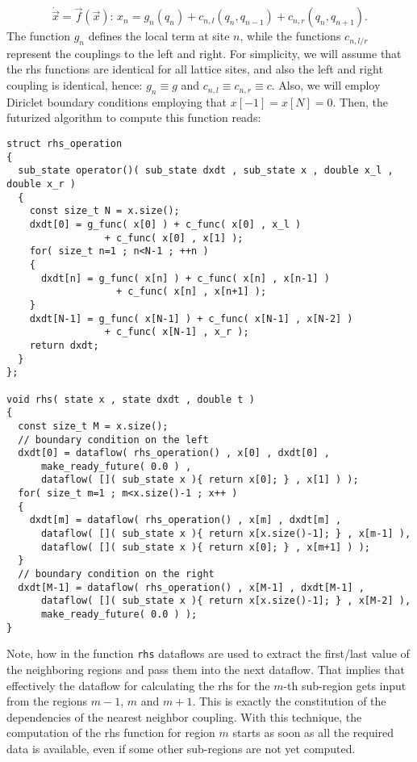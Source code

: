 \documentclass[10pt]{scrartcl}
\begin{document}
\begin{equation}
 \dot{\vec x} = \vec f(\vec x):\, x_n = g_n(q_n) + c_{n,l}(q_{n},q_{n-1}) + c_{n,r}(q_{n},q_{n+1}).
\end{equation} 
The function $g_n$ defines the local term at site $n$, while the functions $c_{n,l/r}$ represent the couplings to the left and right.
For simplicity, we will assume that the rhs functions are identical for all lattice sites, and also the left and right coupling is identical, hence: $g_n \equiv g$ and $c_{n,l} \equiv c_{n,r} \equiv c$.
Also, we will employ Diriclet boundary conditions employing that $x[-1] = x[N] = 0$.
Then, the futurized algorithm to compute this function reads:
\begin{lstlisting}
struct rhs_operation
{
  sub_state operator()( sub_state dxdt , sub_state x , double x_l , double x_r )
  {
    const size_t N = x.size();
    dxdt[0] = g_func( x[0] ) + c_func( x[0] , x_l ) 
			     + c_func( x[0] , x[1] );
    for( size_t n=1 ; n<N-1 ; ++n )
    {
      dxdt[n] = g_func( x[n] ) + c_func( x[n] , x[n-1] ) 
			       + c_func( x[n] , x[n+1] );
    }
    dxdt[N-1] = g_func( x[N-1] ) + c_func( x[N-1] , x[N-2] ) 
				 + c_func( x[N-1] , x_r );
    return dxdt;
  }
};

void rhs( state x , state dxdt , double t )
{
  const size_t M = x.size();
  // boundary condition on the left
  dxdt[0] = dataflow( rhs_operation() , x[0] , dxdt[0] , 
      make_ready_future( 0.0 ) ,
      dataflow( []( sub_state x ){ return x[0]; } , x[1] ) );
  for( size_t m=1 ; m<x.size()-1 ; x++ )
  {
    dxdt[m] = dataflow( rhs_operation() , x[m] , dxdt[m] , 
      dataflow( []( sub_state x ){ return x[x.size()-1]; } , x[m-1] ),
      dataflow( []( sub_state x ){ return x[0]; } , x[m+1] ) );
  }
  // boundary condition on the right
  dxdt[M-1] = dataflow( rhs_operation() , x[M-1] , dxdt[M-1] , 
      dataflow( []( sub_state x ){ return x[x.size()-1]; } , x[M-2] ),
      make_ready_future( 0.0 ) );
}
\end{lstlisting}
Note, how in the function \lstinline+rhs+ dataflows are used to extract the first/last value of the neighboring regions and pass them into the next dataflow.
That implies that effectively the dataflow for calculating the rhs for the $m$-th sub-region gets input from the regions $m-1$, $m$ and $m+1$.
This is exactly the constitution of the dependencies of the nearest neighbor coupling.
With this technique, the computation of the rhs function for region $m$ starts as soon as all the required data is available, even if some other sub-regions are not yet computed.
\end{document}
